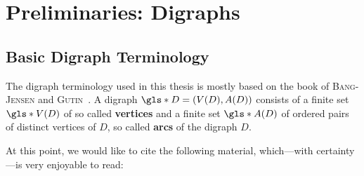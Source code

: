 \chapter{Preliminaries: Digraphs}

\section{Basic Digraph Terminology}
The digraph terminology used in this thesis is mostly based on the book of \textsc{Bang-Jensen} and \textsc{Gutin}~\cite{bang2008digraphs}. A digraph $\gls*{D}=(V(D),A(D))$ consists of a finite set $\gls*{V(D)}$ of so called \textbf{vertices} and a finite set $\gls*{A(D)}$ of ordered pairs of distinct vertices of $D$, so called \textbf{arcs} of the digraph $D$. 

At this point, we would like to cite the following material, which---with certainty---is very enjoyable to read: \cite{Bang-Jensen2020Critical, borodin1977criterion, borodin1977criterion, dirac1950colouring, schweser2018low-connectivity, schweser2020crit, stiebitz2015brooks}